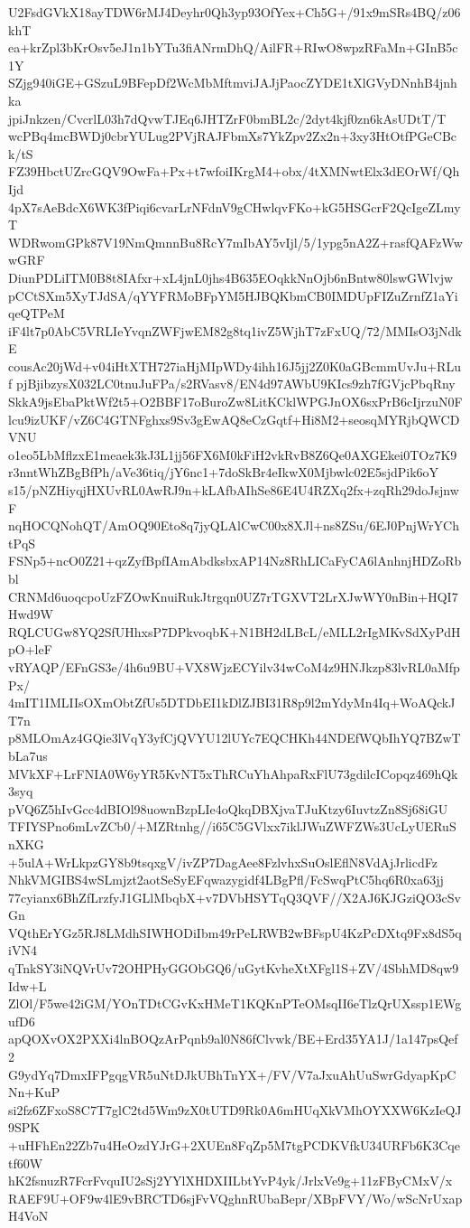 U2FsdGVkX18ayTDW6rMJ4Deyhr0Qh3yp93OfYex+Ch5G+/91x9mSRs4BQ/z06khT
ea+krZpl3bKrOsv5eJ1n1bYTu3fiANrmDhQ/AilFR+RIwO8wpzRFaMn+GInB5c1Y
SZjg940iGE+GSzuL9BFepDf2WcMbMftmviJAJjPaocZYDE1tXlGVyDNnhB4jnhka
jpiJnkzen/CvcrlL03h7dQvwTJEq6JHTZrF0bmBL2c/2dyt4kjf0zn6kAsUDtT/T
wcPBq4mcBWDj0cbrYULug2PVjRAJFbmXs7YkZpv2Zx2n+3xy3HtOtfPGeCBck/tS
FZ39HbctUZrcGQV9OwFa+Px+t7wfoiIKrgM4+obx/4tXMNwtElx3dEOrWf/QhIjd
4pX7sAeBdcX6WK3fPiqi6cvarLrNFdnV9gCHwlqvFKo+kG5HSGcrF2QcIgeZLmyT
WDRwomGPk87V19NmQmnnBu8RcY7mIbAY5vIjl/5/1ypg5nA2Z+rasfQAFzWwwGRF
DiunPDLiITM0B8t8IAfxr+xL4jnL0jhs4B635EOqkkNnOjb6nBntw80lswGWlvjw
pCCtSXm5XyTJdSA/qYYFRMoBFpYM5HJBQKbmCB0IMDUpFIZuZrnfZ1aYiqeQTPeM
iF4lt7p0AbC5VRLIeYvqnZWFjwEM82g8tq1ivZ5WjhT7zFxUQ/72/MMIsO3jNdkE
cousAc20jWd+v04iHtXTH727iaHjMIpWDy4ihh16J5jj2Z0K0aGBcmmUvJu+RLuf
pjBjibzysX032LC0tnuJuFPa/s2RVasv8/EN4d97AWbU9KIcs9zh7fGVjcPbqRny
SkkA9jsEbaPktWf2t5+O2BBF17oBuroZw8LitKCklWPGJnOX6sxPrB6cIjrzuN0F
lcu9izUKF/vZ6C4GTNFghxs9Sv3gEwAQ8eCzGqtf+Hi8M2+seosqMYRjbQWCDVNU
o1eo5LbMflzxE1meaek3kJ3L1jj56FX6M0kFiH2vkRvB8Z6Qe0AXGEkei0TOz7K9
r3nntWhZBgBfPh/aVe36tiq/jY6nc1+7doSkBr4eIkwX0Mjbwlc02E5sjdPik6oY
s15/pNZHiyqjHXUvRL0AwRJ9n+kLAfbAIhSe86E4U4RZXq2fx+zqRh29doJsjnwF
nqHOCQNohQT/AmOQ90Eto8q7jyQLAlCwC00x8XJl+ns8ZSu/6EJ0PnjWrYChtPqS
FSNp5+ncO0Z21+qzZyfBpfIAmAbdksbxAP14Nz8RhLICaFyCA6lAnhnjHDZoRbbl
CRNMd6uoqcpoUzFZOwKnuiRukJtrgqn0UZ7rTGXVT2LrXJwWY0nBin+HQI7Hwd9W
RQLCUGw8YQ2SfUHhxsP7DPkvoqbK+N1BH2dLBcL/eMLL2rIgMKvSdXyPdHpO+leF
vRYAQP/EFnGS3e/4h6u9BU+VX8WjzECYilv34wCoM4z9HNJkzp83lvRL0aMfpPx/
4mIT1IMLIIsOXmObtZfUs5DTDbEI1kDlZJBI31R8p9l2mYdyMn4Iq+WoAQckJT7n
p8MLOmAz4GQie3lVqY3yfCjQVYU12lUYc7EQCHKh44NDEfWQbIhYQ7BZwTbLa7us
MVkXF+LrFNIA0W6yYR5KvNT5xThRCuYhAhpaRxFlU73gdilcICopqz469hQk3syq
pVQ6Z5hIvGcc4dBIOl98uownBzpLIe4oQkqDBXjvaTJuKtzy6IuvtzZn8Sj68iGU
TFIYSPno6mLvZCb0/+MZRtnhg//i65C5GVlxx7iklJWuZWFZWs3UcLyUERuSnXKG
+5ulA+WrLkpzGY8b9tsqxgV/ivZP7DagAee8FzlvhxSuOslEflN8VdAjJrlicdFz
NhkVMGIBS4wSLmjzt2aotSeSyEFqwazygidf4LBgPfl/FcSwqPtC5hq6R0xa63jj
77cyianx6BhZfLrzfyJ1GLlMbqbX+v7DVbHSYTqQ3QVF//X2AJ6KJGziQO3cSvGn
VQthErYGz5RJ8LMdhSIWHODiIbm49rPeLRWB2wBFspU4KzPcDXtq9Fx8dS5qiVN4
qTnkSY3iNQVrUv72OHPHyGGObGQ6/uGytKvheXtXFgl1S+ZV/4SbhMD8qw9Idw+L
ZlOl/F5we42iGM/YOnTDtCGvKxHMeT1KQKnPTeOMsqII6eTlzQrUXssp1EWgufD6
apQOXvOX2PXXi4lnBOQzArPqnb9al0N86fClvwk/BE+Erd35YA1J/1a147psQef2
G9ydYq7DmxIFPgqgVR5uNtDJkUBhTnYX+/FV/V7aJxuAhUuSwrGdyapKpCNn+KuP
si2fz6ZFxoS8C7T7glC2td5Wm9zX0tUTD9Rk0A6mHUqXkVMhOYXXW6KzIeQJ9SPK
+uHFhEn22Zb7u4HeOzdYJrG+2XUEn8FqZp5M7tgPCDKVfkU34URFb6K3Cqetf60W
hK2fsnuzR7FcrFvquIU2sSj2YYlXHDXIILbtYvP4yk/JrlxVe9g+11zFByCMxV/x
RAEF9U+OF9w4lE9vBRCTD6sjFvVQghnRUbaBepr/XBpFVY/Wo/wScNrUxapH4VoN
